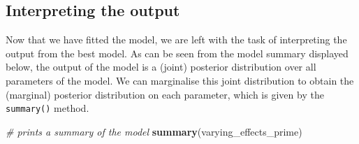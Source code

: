 \documentclass[
  11pt,
  english,
  ,doc,floatsintext]{apa6}
\newenvironment{Shaded}{}{}
\newcommand{\CommentTok}[1]{\textcolor[rgb]{0.38,0.63,0.69}{\textit{#1}}}
\newcommand{\KeywordTok}[1]{\textcolor[rgb]{0.00,0.44,0.13}{\textbf{#1}}}
\newcommand{\NormalTok}[1]{#1}
\begin{document}
\hypertarget{interpreting-the-output}{%
\subsection{Interpreting the output}\label{interpreting-the-output}}

Now that we have fitted the model, we are left with the task of interpreting the output from the best model. As can be seen from the model summary displayed below, the output of the model is a (joint) posterior distribution over all parameters of the model. We can marginalise this joint distribution to obtain the (marginal) posterior distribution on each parameter, which is given by the \texttt{summary()} method.

\begin{Shaded}
\begin{Highlighting}[]
\CommentTok{# prints a summary of the model}
\KeywordTok{summary}\NormalTok{(varying_effects_prime)}
\end{Highlighting}
\end{Shaded}
\end{document}
